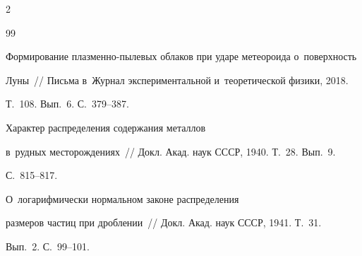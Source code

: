 \begin{multicols}{2}
\vspace*{-6pt}





{\small\frenchspacing


 {%




 \begin{thebibliography}{99}








\vspace*{-2pt}









Формирование плазменно-пылевых облаков при ударе метеороида о~поверхность 


Луны~// Письма в~Журнал экспериментальной и~теоретической физики, 2018. 


Т.~108. Вып.~6. С.~379--387.







 Характер распределения содержания металлов 


в~рудных месторождениях~// Докл. Акад. наук СССР, 1940. Т.~28. Вып.~9. 


С.~815--817.







 О~логарифмически нормальном законе распределения 


размеров частиц при дроблении~// Докл. Акад. наук СССР, 1941. Т.~31. 


Вып.~2. С.~99--101.

















\end{thebibliography}}}
\end{multicols}
